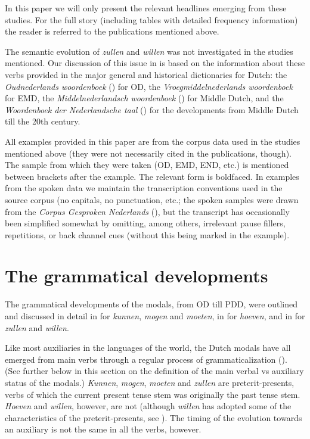 \documentclass[output=paper]{langsci/langscibook}
\begin{document}
In this paper we will only present the relevant headlines emerging from these studies. For the full story (including tables with detailed frequency information) the reader is referred to the publications mentioned above.

The semantic evolution of \textit{zullen} and \textit{willen} was not investigated in the studies mentioned. Our discussion of this issue in  is based on the information about these verbs provided in the major general and historical dictionaries for Dutch: the \textit{Oudnederlands woordenboek} (\citeyear{Oudnederlandswoordenboek2012}) for OD, the \textit{Vroegmiddelnederlands woordenboek} \citep{PijnenburgEtAl2000} for EMD, the \textit{Middelnederlandsch woordenboek} (\citealt{Verwijs1885}) for Middle Dutch, and the \textit{Woordenboek der Nederlandsche taal} (\citealt{DeVriesTeWinkel1864}) for the developments from Middle Dutch till the 20th century.\largerpage

All examples provided in this paper are from the corpus data used in the studies mentioned above (they were not necessarily cited in the publications, though). The sample from which they were taken (OD, EMD, END, etc.) is mentioned between brackets after the example. The relevant form is boldfaced. In examples from the spoken data we maintain the transcription conventions used in the source corpus (no capitals, no punctuation, etc.; the spoken samples were drawn from the \textit{Corpus Gesproken Nederlands} (\citeyear{CorpusgesprokenNederlands2004}), but the transcript has occasionally been simplified somewhat by omitting, among others, irrelevant pause fillers, repetitions, or back channel cues (without this being marked in the example).

\section{The grammatical developments} \label{nuyts:4}

The grammatical developments of the modals, from OD till PDD, were outlined and discussed in detail in \citet{Nuyts2013} for \textit{kunnen}, \textit{mogen} and \textit{moeten}, in \citet{NuytsEtAl2018} for \textit{hoeven}, and in \citet{NuytsEtAlinPrep} for \textit{zullen} and \textit{willen}.

Like most auxiliaries in the languages of the world, the Dutch modals have all emerged from main verbs through a regular process of grammaticalization (\citealt{HopperTraugott2003}). (See further below in this section on the definition of the main verbal vs auxiliary status of the modals.) \textit{Kunnen}, \textit{mogen}, \textit{moeten} and \textit{zullen} are preterit-presents, verbs of which the current present tense stem was originally the past tense stem. \textit{Hoeven} and \textit{willen}, however, are not (although \textit{willen} has adopted some of the characteristics of the preterit-presents, see \citealt{DeVriesTeWinkel1864}). The timing of the evolution towards an auxiliary is not the same in all the verbs, however.
\end{document}
